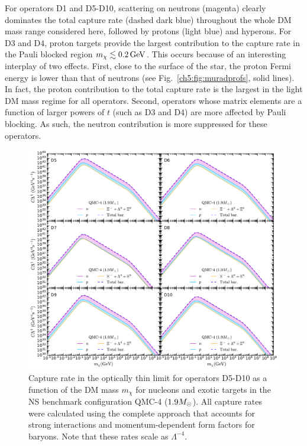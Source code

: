 For operators D1 and D5-D10, scattering on neutrons (magenta) clearly dominates the total capture rate (dashed dark blue) throughout the whole DM mass range considered here, followed by protons (light blue) and hyperons. 
For D3 and D4, proton targets provide the largest contribution to the capture rate in the Pauli blocked region $m_\chi\lesssim0.2{\rm \,GeV}$. This occurs because of an interesting interplay of two effects. First, close to the surface of the star, the proton Fermi energy is lower than that of neutrons (see Fig.~\ref{ch5:fig:muradprofs}, solid lines). In fact, the proton contribution to the total capture rate is the largest in the light DM mass regime for all operators. 
Second, operators whose matrix elements are a function of larger powers of $t$ (such as D3 and D4) are more affected by Pauli blocking. As such, the neutron contribution is more suppressed for these operators. 

\begin{figure}[t!bp] 
\centering
\includegraphics[width=\textwidth]{capture_3/D5_D10_C_mDM_hyper_meff.pdf}
\caption[Capture rate in the optically thin limit for operators D5-D10 as a function of the DM mass $m_\chi$ for nucleons and exotic targets in the NS benchmark configuration QMC-4 ($1.9\Msun$).]{Capture rate in the optically thin limit for operators D5-D10 as a function of the DM mass $m_\chi$ for nucleons and exotic targets in the NS benchmark configuration QMC-4 ($1.9\Msun$). All capture rates were calculated using the complete approach that accounts for strong interactions and momentum-dependent form factors for baryons. Note that these rates scale as $\Lambda^{-4}$. 
}
\label{ch5:fig:capratesD5D10_Hyper}
\end{figure}  

